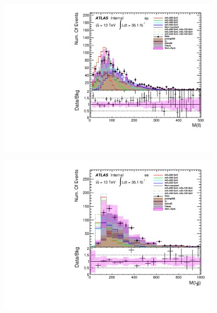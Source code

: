 \begin{figure}[h]
\begin{minipage}[t]{0.33\linewidth}
 \label{fig:dataMC_low_Njet_CR:m_ll_mumu.pdf}
 \end{minipage}
  \begin{minipage}[t]{0.33\linewidth}
 \centering
 \includegraphics[width=1.0\textwidth]{fig/dataMC_low_Njet_CR/m_ll_emu.pdf}
 \label{fig:dataMC_low_Njet_CR:m_ll_emu.pdf}
 \end{minipage}
\begin{minipage}[t]{0.33\linewidth}
 \centering
 \includegraphics[width=1.0\textwidth]{fig/dataMC_low_Njet_CR/m_l1jj_ee.pdf}\label{fig:dataMC_low_Njet_CR:m_l1jj_ee.pdf}
 \end{minipage}
 \begin{minipage}[t]{0.33\linewidth}
 \centering

\end{minipage}
\end{figure}
